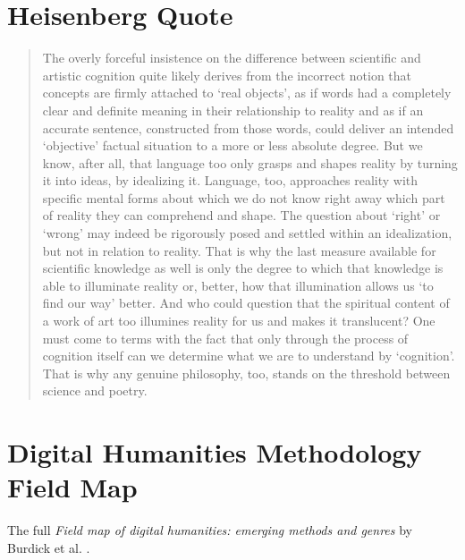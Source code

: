 \section{Heisenberg Quote}
\label{s:heisenberg}

\begin{quotation}
  The overly forceful insistence on the difference between scientific and artistic cognition quite likely derives from the incorrect notion that concepts are firmly attached to `real objects', as if words had a completely clear and definite meaning in their relationship to reality and as if an accurate sentence, constructed from those words, could deliver an intended `objective' factual situation to a more or less absolute degree. But we know, after all, that language too only grasps and shapes reality by turning it into ideas, by idealizing it. Language, too, approaches reality with specific mental forms about which we do not know right away which part of reality they can comprehend and shape. The question about `right' or `wrong' may indeed be rigorously posed and settled within an idealization, but not in relation to reality. That is why the last measure available for scientific knowledge as well is only the degree to which that knowledge is able to illuminate reality or, better, how that illumination allows us `to find our way' better. And who could question that the spiritual content of a work of art too illumines reality for us and makes it translucent? One must come to terms with the fact that only through the process of cognition itself can we determine what we are to understand by `cognition'. That is why any genuine philosophy, too, stands on the threshold between science and poetry. 
\end{quotation}


\section{Digital Humanities Methodology Field Map}
\label{s:dhmap}

The full \textit{Field map of digital humanities: emerging methods and genres} by Burdick et al. \citeyear[p.29-60]{Burdick2012}.

